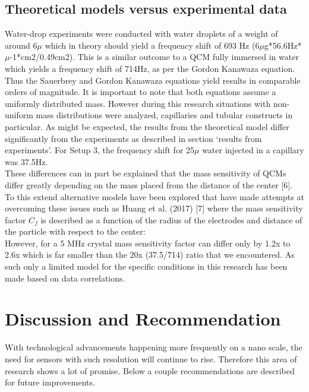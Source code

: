 \documentclass[a4paper, 10pt, conference]{ieeeconf}      %
\begin{document}
    
\subsection{Theoretical models versus experimental data}
    Water-drop experiments were conducted with water droplets of a weight of around 6$\mu$ which in theory should yield a frequency shift of 693 Hz (6$\mu$g*56.6Hz*$\mu$-1*cm2/0.49cm2).
    This is a similar outcome to a QCM fully immersed in water which yields a frequency shift of 714Hz, as per the Gordon Kanawaza equation. \\

    Thus the Sauerbrey and Gordon Kanawaza equations yield results in comparable orders of magnitude.
    It is important to note that both equations assume a uniformly distributed mass.
    However during this research situations with non-uniform mass distributions were analyzed, capillaries and tubular constructs in particular.
    As might be expected, the results from the theoretical model differ significantly from the experiments as described in section ‘results from experiments’.
    For Setup 3, the frequency shift for 25$\mu$ water injected in a capillary was 37.5Hz.  \\

    These differences can in part be explained that the mass sensitivity of QCMs differ greatly depending on the mass placed from the distance of the center [6].
    To this extend alternative models have been explored that have made attempts at overcoming these issues such as Huang et al. (2017) [7] where the mass sensitivity factor $C_f$ is described as a function of the radius of the electrodes and distance of the particle with respect to the center: \\

    However, for a 5 MHz crystal mass sensitivity factor can differ only by 1.2x to 2.6x which is far smaller than the 20x (37.5/714) ratio that we encountered. As such only a limited model for the specific conditions in this research has been made based on data correlations. \\



\section{Discussion and Recommendation}
    With technological advancements happening more frequently on a nano scale, the need for sensors with such resolution will continue to rise.
    Therefore this area of research shows a lot of promise. Below a couple recommendations are described for future improvements. \\
\end{document}
